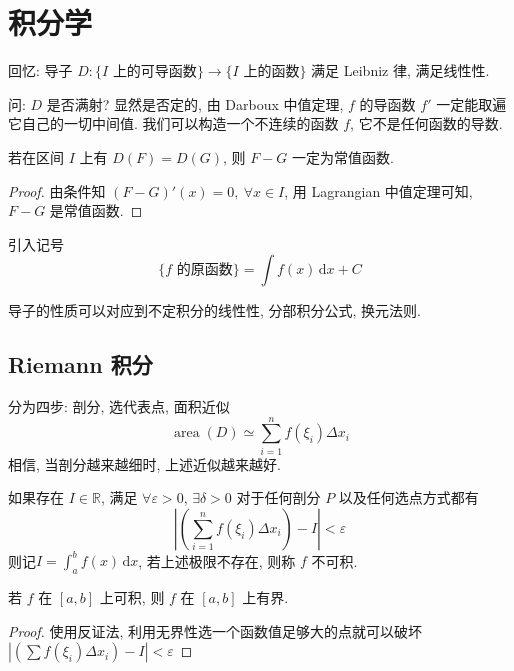 
\section{积分学}

回忆: 导子 $D\colon \{ \text{$I$ 上的可导函数}  \}\to \{ \text{$I$ 上的函数} \}$
满足 Leibniz 律, 满足线性性. 


问: $D$ 是否满射? 显然是否定的, 由 Darboux 中值定理, $f$ 的导函数 $f'$ 一定能取遍它自己的一切中间值. 我们可以构造一个不连续的函数 $f$, 它不是任何函数的导数.

\begin{proposition}
  若在区间 $I$ 上有 $D\left( F \right) = D \left( G \right)$, 则 $F - G$ 一定为常值函数. 
\end{proposition}
\begin{proof}
  由条件知 $\left( F - G \right)' (x) = 0 , \ \forall x \in I$, 用 Lagrangian 中值定理可知, $F-G$ 是常值函数.
\end{proof}

引入记号
\begin{equation}
  \{ \text{$f$ 的原函数} \} = \int f(x) \, \mathrm{d} x + C
\end{equation}

导子的性质可以对应到不定积分的线性性, 分部积分公式, 换元法则.

\subsection{Riemann 积分}
分为四步: 剖分, 选代表点, 面积近似
\begin{equation}
  \operatorname{area} \left( D \right) \simeq \sum_{i=1}^{n}  f(\xi _{i}) \Delta x_{i}
\end{equation} 
相信, 当剖分越来越细时, 上述近似越来越好.

\begin{definition}[Riemann 积分]
  如果存在 $I \in \mathbb{R}$, 满足 $\forall \varepsilon > 0$, $\exists \delta > 0$ 对于任何剖分 $P$ 以及任何选点方式都有
  \begin{equation}
    \left| \left( \sum_{i=1}^{n}  f\left( \xi _{i} \right)\Delta x_{i} \right) - I \right| < \varepsilon
  \end{equation}
则记$I = \int _{a}^{b} f\left( x \right)\, \mathrm{d} x$, 若上述极限不存在, 则称 $f$ 不可积.
\end{definition}

\begin{proposition}
  若 $f$ 在 $[a,b]$ 上可积, 则 $f$ 在 $[a,b]$ 上有界.
\end{proposition}
\begin{proof}
  使用反证法, 利用无界性选一个函数值足够大的点就可以破坏 $\left| \left( \sum  f\left( \xi _{i} \right)\Delta x_{i} \right) - I \right| < \varepsilon $
\end{proof}

